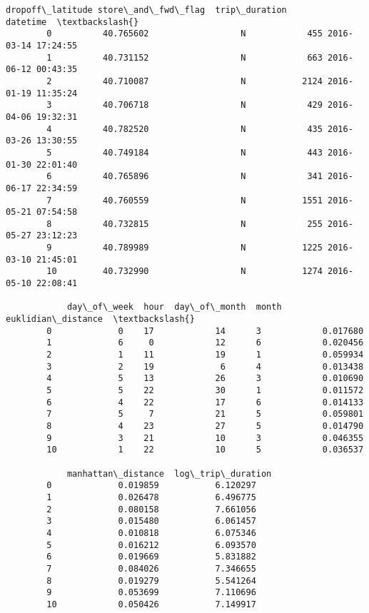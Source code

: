 \documentclass[11pt]{article}
\begin{document}
\begin{Verbatim}[commandchars=\\\{\}]
            dropoff\_latitude store\_and\_fwd\_flag  trip\_duration            datetime  \textbackslash{}
        0          40.765602                  N            455 2016-03-14 17:24:55   
        1          40.731152                  N            663 2016-06-12 00:43:35   
        2          40.710087                  N           2124 2016-01-19 11:35:24   
        3          40.706718                  N            429 2016-04-06 19:32:31   
        4          40.782520                  N            435 2016-03-26 13:30:55   
        5          40.749184                  N            443 2016-01-30 22:01:40   
        6          40.765896                  N            341 2016-06-17 22:34:59   
        7          40.760559                  N           1551 2016-05-21 07:54:58   
        8          40.732815                  N            255 2016-05-27 23:12:23   
        9          40.789989                  N           1225 2016-03-10 21:45:01   
        10         40.732990                  N           1274 2016-05-10 22:08:41   
        
            day\_of\_week  hour  day\_of\_month  month  euklidian\_distance  \textbackslash{}
        0             0    17            14      3            0.017680   
        1             6     0            12      6            0.020456   
        2             1    11            19      1            0.059934   
        3             2    19             6      4            0.013438   
        4             5    13            26      3            0.010690   
        5             5    22            30      1            0.011572   
        6             4    22            17      6            0.014133   
        7             5     7            21      5            0.059801   
        8             4    23            27      5            0.014790   
        9             3    21            10      3            0.046355   
        10            1    22            10      5            0.036537   
        
            manhattan\_distance  log\_trip\_duration  
        0             0.019859           6.120297  
        1             0.026478           6.496775  
        2             0.080158           7.661056  
        3             0.015480           6.061457  
        4             0.010818           6.075346  
        5             0.016212           6.093570  
        6             0.019669           5.831882  
        7             0.084026           7.346655  
        8             0.019279           5.541264  
        9             0.053699           7.110696  
        10            0.050426           7.149917  
\end{Verbatim}
            
\end{document}
